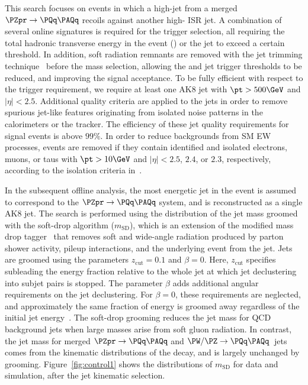 \documentclass[11pt,twoside,a4paper,cmspaper,final,collab]{cms-tdr}
\begin{document}
This search focuses on events in which a high-\pt jet from a merged
$\PZpr \to \PQq\PAQq$ recoils against another high-\pt
ISR jet.  A combination of several online signatures is required for
the trigger selection, all requiring the total hadronic transverse
energy in the event (\HT) or the jet \pt to exceed a certain threshold.  
In addition, soft radiation remnants are removed with the jet trimming technique~\cite{Krohn:2009th} 
before the mass selection, allowing the \HT and jet \pt trigger thresholds to be reduced, and improving the signal acceptance.
To be fully efficient with respect to the trigger requirement, we require at
least one AK8 jet with $\pt > 500\GeV$ and $|\eta| < 2.5$. 
Additional quality criteria are applied to the jets in order to remove
spurious jet-like features originating from isolated noise patterns in
the calorimeters or the tracker.  The efficiency of these jet quality
requirements for signal events is above $99\%$.  
In order to reduce backgrounds from SM EW processes, events are removed
if they contain identified and isolated electrons, muons, or taus with $\pt > 10\GeV$
and $|\eta| < 2.5$, $2.4$, or $2.3$, respectively, according to the isolation criteria in~\cite{Sirunyan:2017hci}.

In the subsequent offline analysis, the most energetic jet in the event is assumed to 
correspond to the $\PZpr \to \PQq\PAQq$ system, and is reconstructed as a single AK8 jet. 
The search is performed using the distribution of the jet mass groomed
with the soft-drop algorithm ($m_\text{SD}$), which is an extension of the modified 
mass drop tagger~\cite{Dasgupta:2013ihk,Larkoski:2014wba} that 
removes soft and wide-angle radiation produced by
parton shower activity, pileup interactions, and the underlying event from the jet.
Jets are groomed using the parameters $z_\text{cut} = 0.1$ and $\beta = 0$.
Here, $z_\text{cut}$ specifies subleading the energy fraction relative to the whole jet at which jet declustering into subjet pairs is stopped.  
The parameter $\beta$ adds additional angular requirements on the jet declustering.  For 
$\beta = 0$, these requirements are neglected, and approximately the same fraction of energy is groomed away
regardless of the initial jet energy~\cite{Larkoski:2014wba}.
The soft-drop grooming reduces the jet mass for QCD background jets 
when large masses arise from soft gluon radiation.
In contrast, the jet mass for merged 
$\PZpr \to \PQq\PAQq$ and $\PW/\PZ \to \PQq\PAQq$~jets
comes from the kinematic distributions of the
decay, and is largely unchanged by grooming.
Figure~\ref{fig:control1} shows the  
distributions of $m_\text{SD}$
for data and simulation, after the jet kinematic selection.
\end{document}
